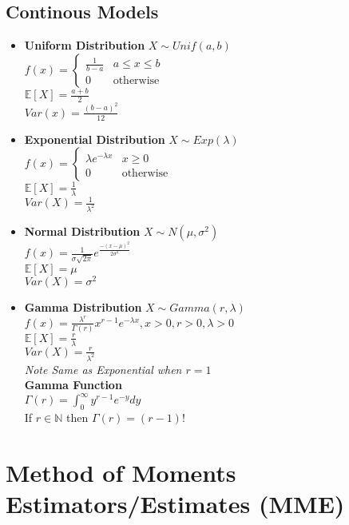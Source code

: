 \documentclass{article}
\begin{document}
\subsection{Continous Models}
\label{sec:continuous}
\begin{itemize}
    \item \textbf{Uniform Distribution} $X\sim Unif(a,b)$\\
    $f(x)=\begin{cases}
        \frac{1}{b-a}&a\leq x\leq b\\
        0&\text{otherwise}
    \end{cases}$\\
    $\mathbb{E}[X]=\frac{a+b}{2}$\\
    $Var(x)=\frac{(b-a)^2}{12}$
    \item \textbf{Exponential Distribution} $X\sim Exp(\lambda)$\\
    $f(x)=\begin{cases}
        \lambda e^{-\lambda x}&x\geq0\\
        0&\text{otherwise}
    \end{cases}$\\
    $\mathbb{E}[X]=\frac{1}{\lambda}$\\
    $Var(X)=\frac{1}{\lambda^2}$
    \item \textbf{Normal Distribution} $X\sim N(\mu,\sigma^2)$\\
    $f(x)=\frac{1}{\sigma\sqrt{2\pi}}e^{\frac{-(x-\mu)^2}{2\sigma^2}}$\\
    $\mathbb{E}[X]=\mu$\\
    $Var(X)=\sigma^2$
    \item \textbf{Gamma Distribution} $X\sim Gamma(r,\lambda)$\\
    $f(x)=\frac{\lambda^r}{\Gamma(r)}x^{r-1}e^{-\lambda x},x>0,r>0,\lambda>0$\\
    $\mathbb{E}[X]=\frac{r}{\lambda}$\\
    $Var(X)=\frac{r}{\lambda^2}$\\
    \textit{Note Same as Exponential when $r=1$}\\
    \textbf{Gamma Function}\\
    $\Gamma(r)=\int_0^\infty y^{r-1}e^{-y}dy$\\
    If $r\in\mathbb{N}$ then $\Gamma(r)=(r-1)!$
\end{itemize}
\section{Method of Moments Estimators/Estimates (MME)}
\label{sec:MME}
\end{document}
